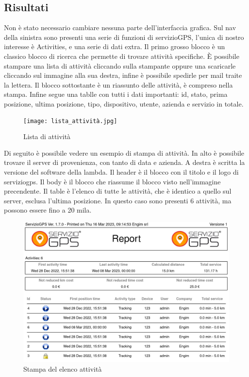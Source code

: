 \documentclass[12pt]{article}
\begin{document}
\subsection{Risultati}
Non è stato necessario cambiare nessuna parte dell'interfaccia grafica.
Sul nav della sinistra sono presenti una serie di funzioni di servizioGPS, 
l'unica di nostro interesse è Activities, e una serie di dati extra. 
Il primo grosso blocco è un classico blocco di ricerca che permette 
di trovare attività specifiche.
È possibile stampare una lista di attività cliccando sulla stampante oppure una 
scaricarle cliccando sul immagine alla sua destra, infine è possibile spedirle 
per mail traite la lettera. 
Il blocco sottostante è un riassunto delle attività, è compreso nella stampa. 
Infine segue una tablle con tutti i dati importanti: id, stato, 
prima posizione, ultima posizione, tipo, dispositivo, utente, 
azienda e servizio in totale. 
\begin{figure}[H]
\texttt{[image: lista\_attività.jpg]}
\caption{Lista di attività}
\label{fig:mesh3}
\end{figure}
Di seguito è possibile vedere un esempio di stampa di attività. 
In alto è possibile trovare il server di provenienza, con tanto di data e 
azienda.
A destra è scritta la versione del software della lambda. 
Il header è il blocco con il titolo e il logo di serviziogps.
Il body è il blocco che riassume il blocco visto nell'immagine precendente. 
Il table è l'elenco di tutte le attività, che è identico a quello sul server, 
esclusa l'ultima posizione.
In questo caso sono presenti 6 attività, ma possono essere fino a 20 mila. 
\begin{figure}[H]
\includegraphics[width =\textwidth]{report.png}
\caption{Stampa del elenco attività}
\label{fig:mesh4}
\end{figure}
\end{document}
